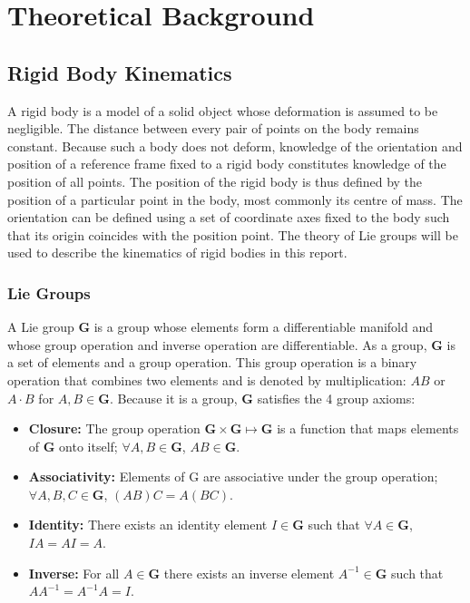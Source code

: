\chapter{Theoretical Background}

\section{Rigid Body Kinematics}
	A rigid body is a model of a solid object whose deformation is assumed to be negligible. The distance between every pair of points on the body remains constant. Because such a body does not deform, knowledge of the orientation and position of a reference frame fixed to a rigid body constitutes knowledge of the position of all points. The position of the rigid body is thus defined by the position of a particular point in the body, most commonly its centre of mass. The orientation can be defined using a set of coordinate axes fixed to the body such that its origin coincides with the position point.
	The theory of Lie groups will be used to describe the kinematics of rigid bodies in this report.
			
	\subsection{Lie Groups}		
		A Lie group $\mathbf{G}$ is a group whose elements form a differentiable manifold and whose group operation and inverse operation are differentiable.
		As a group, $\mathbf{G}$ is a set of elements and a group operation. This group operation is a binary operation that combines two elements and is denoted by multiplication: $AB$ or $A \cdot B$ for $A,B \in \mathbf{G}$. Because it is a group, $\mathbf{G}$ satisfies the 4 group axioms:
		\begin{itemize}
		\item \textbf{Closure:} 
			The group operation
			$\mathbf{G} \times \mathbf{G} \mapsto \mathbf{G}$ 
			is a function that maps elements of $\mathbf{G}$ onto itself;
			$\forall A,B \in \mathbf{G}$, $AB \in \mathbf{G}$.
		\item \textbf{Associativity:} Elements of G are associative under the group operation;
			$\forall A,B,C \in \mathbf{G}$, $(AB)C=A(BC)$.
		\item \textbf{Identity:} There exists an identity element $I \in \mathbf{G}$  such that
			$\forall A \in \mathbf{G}$, $IA = AI = A$.
		\item \textbf{Inverse:} For all $A \in \mathbf{G}$ there exists an inverse element $A^{-1} \in \mathbf{G}$ such that $AA^{-1}=A^{-1}A=I$. 
		\end{itemize}
		
